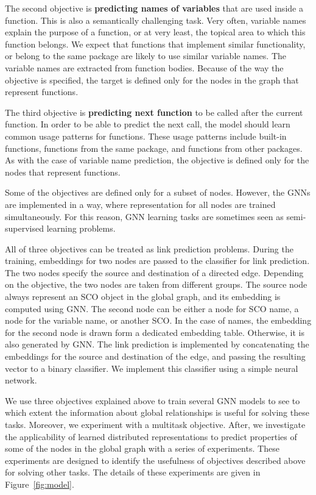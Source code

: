 \documentclass[a4paper,twoside]{article}
\begin{document}
The second objective is \textbf{predicting names of variables} that are used inside a function. This is also a semantically challenging task. Very often, variable names explain the purpose of a function, or at very least, the topical area to which this function belongs. We expect that functions that implement similar functionality, or belong to the same package are likely to use similar variable names. The variable names are extracted from function bodies. Because of the way the objective is specified, the target is defined only for the nodes in the graph that represent functions.  

The third objective is \textbf{predicting next function} to be called after the current function. In order to be able to predict the next call, the model should learn common usage patterns for functions. These usage patterns include built-in functions, functions from the same package, and functions from other packages. As with the case of variable name prediction, the objective is defined only for the nodes that represent functions. 

Some of the objectives are defined only for a subset of nodes. However, the GNNs are implemented in a way, where representation for all nodes are trained simultaneously. For this reason, GNN learning tasks are sometimes seen as semi-supervised learning problems.

All of three objectives can be treated as link prediction problems. During the training, embeddings for two nodes are passed to the classifier for link prediction. The two nodes specify the source and destination of a directed edge. Depending on the objective, the two nodes are taken from different groups. The source node always represent an SCO object in the global graph, and its embedding is computed using GNN\@. The second node can be either a node for SCO name, a node for the variable name, or another SCO\@. In the case of names, the embedding for the second node is drawn form a dedicated embedding table. Otherwise, it is also generated by GNN\@. The link prediction is implemented by concatenating the embeddings for the source and destination of the edge, and passing the resulting vector to a binary classifier. We implement this classifier using a simple neural network.

We use three objectives explained above to train several GNN models to see to which extent the information about global relationships is useful for solving these tasks. Moreover, we experiment with a multitask objective. After, we investigate the applicability of learned distributed representations to predict properties of some of the nodes in the global graph with a series of experiments. These experiments are designed to identify the usefulness of objectives described above for solving other tasks. The details of these experiments are given in Figure~\ref{fig:model}.
\end{document}

